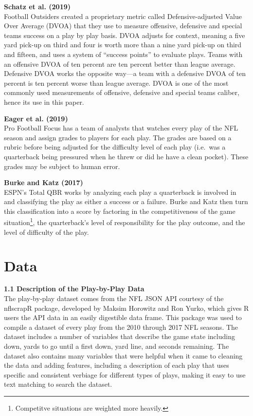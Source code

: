 \documentclass[12pt,twoside]{dukestatscithesis}
\begin{document}
\textbf{Schatz et al. (2019)}\\
Football Outsiders created a proprietary metric called Defensive-adjusted Value Over Average (DVOA) that they use to measure offensive, defensive and special teams success on a play by play basis. DVOA adjusts for context, meaning a five yard pick-up on third and four is worth more than a nine yard pick-up on third and fifteen, and uses a system of ``success points'' to evaluate plays. Teams with an offensive DVOA of ten percent are ten percent better than league average. Defensive DVOA works the opposite way---a team with a defensive DVOA of ten percent is ten percent worse than league average. DVOA is one of the most commonly used measurements of offensive, defensive and special teams caliber, hence its use in this paper.

\textbf{Eager et al. (2019)}\\
Pro Football Focus has a team of analysts that watches every play of the NFL season and assign grades to players for each play. The grades are based on a rubric before being adjusted for the difficulty level of each play (i.e.~was a quarterback being pressured when he threw or did he have a clean pocket). These grades may be subject to human error.

\textbf{Burke and Katz (2017)}\\
ESPN's Total QBR works by analyzing each play a quarterback is involved in and classifying the play as either a success or a failure. Burke and Katz then turn this classification into a score by factoring in the competitiveness of the game situation\footnote{Competitve situations are weighted more heavily.}, the quarterback's level of responsibility for the play outcome, and the level of difficulty of the play.

\hypertarget{data}{%
\chapter{Data}\label{data}}

\textbf{1.1 Description of the Play-by-Play Data}\\
The play-by-play dataset comes from the NFL JSON API courtesy of the nflscrapR package, developed by Maksim Horowitz and Ron Yurko, which gives R users the API data in an easily digestible data frame. This package was used to compile a dataset of every play from the 2010 through 2017 NFL seasons. The dataset includes a number of variables that describe the game state including down, yards to go until a first down, yard line, and seconds remaining. The dataset also contains many variables that were helpful when it came to cleaning the data and adding features, including a description of each play that uses specific and consistent verbiage for different types of plays, making it easy to use text matching to search the dataset.
\end{document}
